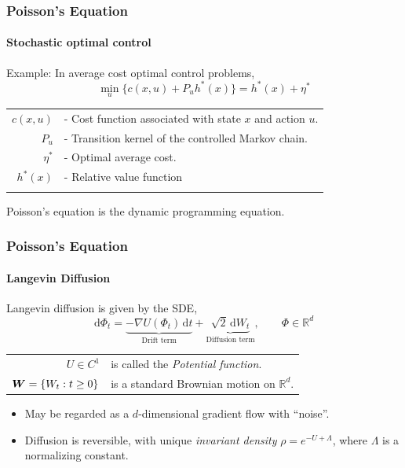 \documentclass[xcolor=dvipsnames, subsection=false]{beamer}
\def\alertb#1{\alert{\color{BrickRed}  #1}}
\def\alertb#1{\alert{\color{BrickRed}  #1}}
\def\bfmath#1{{\mathchoice{\mbox{\boldmath$#1$}}%
{\mbox{\boldmath$#1$}}%
{\mbox{\boldmath$\scriptstyle#1$}}%
{\mbox{\boldmath$\scriptscriptstyle#1$}}}}
\def\bfmW{\bfmath{W}}
\newcommand{\field}[1]{\mathbb{#1}}
\def\Re{\field{R}}
\def\markovstate{\Phi}
\def\ud{\text{d}}
\newcommand{\pot}{U}
\newcommand{\pr}{\rho}
\begin{document}
\begin{frame}
\frametitle{Poisson's Equation}
\framesubtitle{Stochastic optimal control}
 \alertb{Example:} In average cost optimal control problems,
\[
\min_u \{c(x,u) + P_u h^*(x) \} = h^*(x) + \eta^*
\]
\begin{tabular}{rl}
$c(x,u)$ & - Cost function associated with state $x$ and action $u$.\\
$P_u$ & - Transition kernel of the controlled Markov chain. \\	
$\eta^*$ & - Optimal average cost.\\
{\LARGE \alertb{$h^*(x)$}} & - {\LARGE \alertb{Relative value function}} \\\pause
\end{tabular}
Poisson's equation is the dynamic programming equation.
\end{frame}

\begin{frame}
\frametitle{Poisson's Equation}
\framesubtitle{Langevin Diffusion}
\alertb{Langevin diffusion} is given by the SDE,
 {\[
\ud \markovstate_t =\underbrace{- \nabla \pot(\markovstate_t) \, \ud t}_{\text{Drift term}}
+ \underbrace{\sqrt{2} \, \ud W_t}_{\text{Diffusion term}}, \qquad \markovstate \in \Re^d
\label{e:langevin_intro}
\]}
\begin{tabular}{rl}
$\pot \in C^1$ & is called the \textit{Potential function}.\\
$\bfmW =\{W_t : t\ge 0\}$ & is a standard Brownian motion on $\Re^d$. \pause \\[1em]
\end{tabular}
\begin{itemize}
\item May be regarded as a $d$-dimensional gradient flow with ``noise''. \pause
\item Diffusion is reversible, with unique \textit{invariant density} $\pr=e^{-\pot+\Lambda}$, where $\Lambda$ is a normalizing constant.
\end{itemize}
\end{frame}
\end{document}
